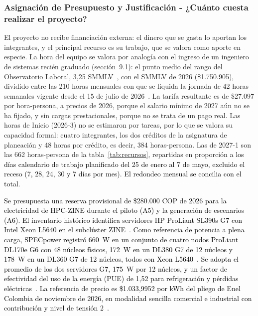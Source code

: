 
\subsubsection{Asignación de Presupuesto y Justificación - ¿Cuánto cuesta realizar el proyecto?}\label{sec:spmp-9-3-4}
El proyecto no recibe financiación externa: el dinero que se gasta lo aportan los integrantes, y el principal recurso es su trabajo, que se valora como aporte en especie. La hora del equipo se valora por analogía con el ingreso de un ingeniero de sistemas recién graduado (sección~9.1): el punto medio del rango del Observatorio Laboral, 3,25 SMMLV~\cite{ole2022}, con el SMMLV de 2026 (\$1.750.905), dividido entre las 210 horas mensuales con que se liquida la jornada de 42 horas semanales vigente desde el 15 de julio de 2026~\cite{portafolio2026hora}. La tarifa resultante es de \$27.097 por hora-persona, a precios de 2026, porque el salario mínimo de 2027 aún no se ha fijado, y sin cargas prestacionales, porque no se trata de un pago real. Las horas de Inicio (2026-3) no se estimaron por tareas, por lo que se valora su capacidad formal: cuatro integrantes, los dos créditos de la asignatura de planeación y 48 horas por crédito, es decir, 384 horas-persona. Las de 2027-1 son las 662 horas-persona de la tabla~\ref{tab:recursos}, repartidas en proporción a \textcolor{black}{los días calendario de trabajo planificado del 25 de enero al 7 de mayo, excluido el receso (7, 28, 24, 30 y 7 días por mes). El redondeo mensual se concilia con el total}.
 
\textcolor{black}{Se presupuesta una reserva provisional de \$280.000 COP de 2026 para la electricidad de HPC-ZINE durante el piloto (A5) y la generación de escenarios (A6). El inventario histórico identifica servidores HP ProLiant SL390s G7 con Intel Xeon L5640 en el subclúster ZINE~\cite{biosInventarioZine}. Como referencia de potencia a plena carga, SPECpower registró 660~W en un conjunto de cuatro nodos ProLiant DL170e G6 con 48 núcleos físicos, 172~W en un DL380 G7 de 12 núcleos y 178~W en un DL360 G7 de 12 núcleos, todos con Xeon L5640~\cite{specHpcDl170e,specHpcDl380,specHpcDl360}. Se adopta el promedio de los dos servidores G7, 175~W por 12 núcleos, y un factor de efectividad del uso de la energía (PUE) de 1,52 para refrigeración y pérdidas eléctricas~\cite{uptime2026pue}. La referencia de precio es \$1.033,9952 por kWh del pliego de Enel Colombia de noviembre de 2026, en modalidad sencilla comercial e industrial con contribución y nivel de tensión 2~\cite{enel2026noviembre}.}


